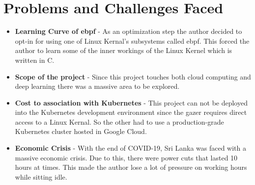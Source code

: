 \section{Problems and Challenges Faced}

\begin{itemize}[noitemsep,nolistsep]
    \item \textbf{Learning Curve of \ac{ebpf}} - As an optimization step the author decided to opt-in for using one of Linux Kernal's subsystems called \ac{ebpf}. This forced the author to learn some of the inner workings of the Linux Kernel which is written in C.
    \item \textbf{Scope of the project} - Since this project touches both cloud computing and deep learning there was a massive area to be explored.
    \item \textbf{Cost to association with Kubernetes} - This project can not be deployed into the Kubernetes development environment since the \ac{gazer} requires direct access to a Linux Kernal. So the other had to use a production-grade Kubernetes cluster hosted in Google Cloud.
    \item \textbf{Economic Crisis} - With the end of COVID-19, Sri Lanka was faced with a massive economic crisis. Due to this, there were power cuts that lasted 10 hours at times. This made the author lose a lot of pressure on working hours while sitting idle.
\end{itemize}